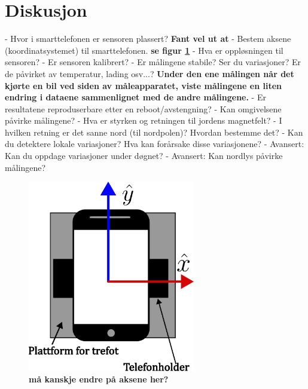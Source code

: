\section{Diskusjon}

- Hvor i smarttelefonen er sensoren plassert?  \textbf{Fant vel ut at } \newline 
- Bestem aksene (koordinatsystemet) til smarttelefonen. \textbf{se figur \ref{fig:telf_akser} }\newline 
- Hva er oppløsningen til sensoren? \newline
- Er sensoren kalibrert? \newline
- Er målingene stabile? Ser du variasjoner? Er de påvirket av temperatur, lading
osv...? \textbf{Under den ene målingen når det kjørte en bil ved siden av måleapparatet, viste målingene en liten endring i dataene sammenlignet med de andre målingene. }\newline
- Er resultatene reproduserbare etter en reboot/avstengning? \newline
- Kan omgivelsene påvirke målingene? \newline
- Hva er styrken og retningen til jordens magnetfelt?  \newline
- I hvilken retning er det sanne nord (til nordpolen)? Hvordan bestemme det? \newline
- Kan du detektere lokale variasjoner? Hva kan forårsake disse variasjonene?  \newline
- Avansert: Kan du oppdage variasjoner under døgnet? \newline
- Avansert: Kan nordlys påvirke målingene? \newline

\begin{figure}
    \centering
    \includegraphics[width=0.65\textwidth]{img/Plattform med telefoni.pdf}
    \caption{\textbf{må kanskje endre på aksene her?} 
        }
    \label{fig:telf_akser}
\end{figure}